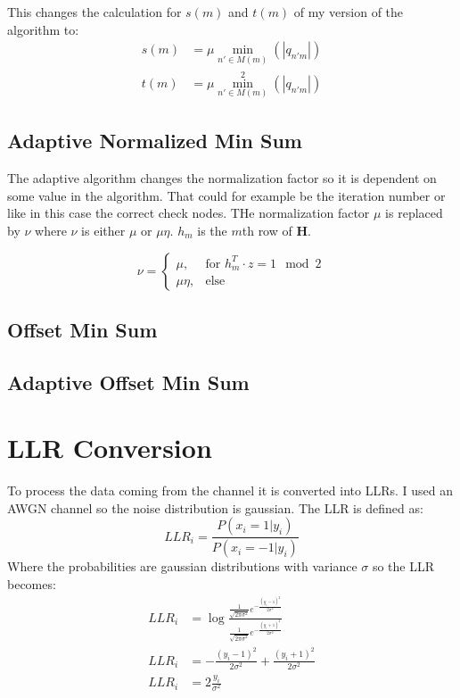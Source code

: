 This changes the calculation for $s(m)$ and $t(m)$ of my version of the algorithm to:
\begin{align}
    s(m) & = \mu \min_{n' \in M(m)}(\left|q_{n'm}\right|) \\
    t(m) & = \mu \min_{n' \in M(m)}^2(\left|q_{n'm}\right|) 
\end{align}

\subsection{Adaptive Normalized Min Sum}
The adaptive algorithm changes the normalization factor so it is dependent on some value in the algorithm. That could for example be the iteration number or like in this case the correct check nodes. THe normalization factor $\mu$ is replaced by $\nu$ where $\nu$ is either $\mu$ or $\mu \eta$. $h_m$ is the $m$th row of $\bm{H}$.


\begin{equation}
    \nu = \begin{cases}
        \mu, & \text{for } h^T_m \cdot z = 1 \mod 2 \\
        \mu \eta, & \text{else}
    \end{cases}
\end{equation}

\subsection{Offset Min Sum}

\subsection{Adaptive Offset Min Sum}

\section{LLR Conversion} \label{llr_approach}
To process the data coming from the channel it is converted into LLRs. I used an AWGN channel so the noise distribution is gaussian. The LLR is defined as:
\begin{equation}
    LLR_i = \frac{P(x_i = 1 | y_i)}{P(x_i = -1 | y_i)}
\end{equation}
Where the probabilities are gaussian distributions with variance $\sigma$ so the LLR becomes:
\begin{align}
    LLR_i & = \log{\frac{\frac{1}{\sqrt{2 \pi \sigma^2}}e^{-\frac{(y_i - 1)^2}{2 \sigma^2}}}{\frac{1}{\sqrt{2 \pi \sigma^2}}e^{-\frac{(y_i + 1)^2}{2 \sigma^2}}}} \\
    LLR_i & = -\frac{(y_i - 1)^2}{2 \sigma^2} + \frac{(y_i + 1)^2}{2 \sigma^2} \\
    LLR_i & = 2\frac{y_i}{\sigma^2}
\end{align}

